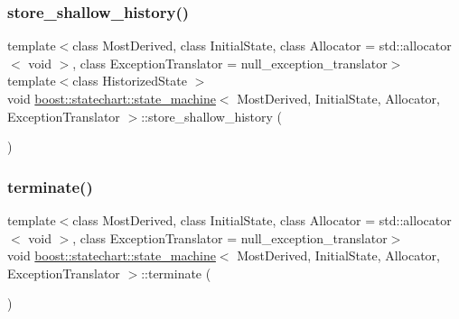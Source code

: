 \subsubsection{\texorpdfstring{store\+\_\+shallow\+\_\+history()}{store\_shallow\_history()}}
{\footnotesize\ttfamily template$<$class Most\+Derived, class Initial\+State, class Allocator = std\+::allocator$<$ void $>$, class Exception\+Translator = null\+\_\+exception\+\_\+translator$>$ \\
template$<$class Historized\+State $>$ \\
void \mbox{\hyperlink{classboost_1_1statechart_1_1state__machine}{boost\+::statechart\+::state\+\_\+machine}}$<$ Most\+Derived, Initial\+State, Allocator, Exception\+Translator $>$\+::store\+\_\+shallow\+\_\+history (\begin{DoxyParamCaption}{ }\end{DoxyParamCaption})\hspace{0.3cm}{\ttfamily [inline]}}

\mbox{\label{classboost_1_1statechart_1_1state__machine_a6abd7c38c09f87fa662c5aa5e8f6f3ff}} 
\subsubsection{\texorpdfstring{terminate()}{terminate()}}
{\footnotesize\ttfamily template$<$class Most\+Derived, class Initial\+State, class Allocator = std\+::allocator$<$ void $>$, class Exception\+Translator = null\+\_\+exception\+\_\+translator$>$ \\
void \mbox{\hyperlink{classboost_1_1statechart_1_1state__machine}{boost\+::statechart\+::state\+\_\+machine}}$<$ Most\+Derived, Initial\+State, Allocator, Exception\+Translator $>$\+::terminate (\begin{DoxyParamCaption}{ }\end{DoxyParamCaption})\hspace{0.3cm}{\ttfamily [inline]}}

